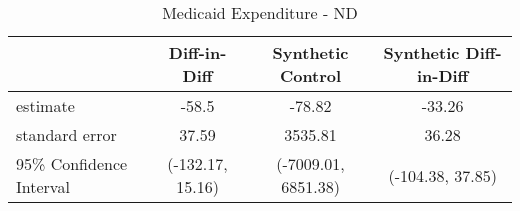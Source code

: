 \begin{table}[ht]
\centering
\begin{tabular}{lccc}
  \hline
 & Diff-in-Diff & Synthetic Control & Synthetic Diff-in-Diff \\ 
  \hline
estimate & -58.5 & -78.82 & -33.26 \\ 
  standard error & 37.59 & 3535.81 & 36.28 \\ 
  95\% Confidence Interval & (-132.17, 15.16) & (-7009.01, 6851.38) & (-104.38, 37.85) \\ 
   \hline
\end{tabular}
\caption{Medicaid Expenditure - ND} 
\end{table}
